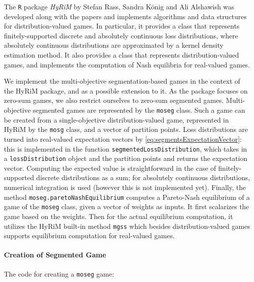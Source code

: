 \documentclass[a4paper]{scrreprt}
\theoremstyle{definition}
\begin{document}
    The \texttt{R} package \emph{HyRiM}  by Stefan Rass, Sandra König and Ali Alshawish was developed along with the papers \cite{bib:rassGameRiskManagI,bib:rassGameRiskManagII,bib:rassGameRiskManagIII} and implements algorithms and data structures for distribution-valued games.
    In particular, it provides a class that represents finitely-supported discrete and absolutely continuous loss distributions, where absolutely continuous distributions are approximated by a kernel density estimation method. It also provides a class that represents distribution-valued games, and implements the computation of Nash equilibria for real-valued games.
    
    We implement the multi-objective segmentation-based games in the context of the HyRiM package, and as a possible extension to it. As the package focuses on zero-sum games, we also restrict ourselves to zero-sum segmented games.
    Multi-objective segmented games are represented by the \texttt{moseg} class. Such a game can be created from a single-objective distribution-valued game, represented in HyRiM by the \texttt{mosg} class, and a vector of partition points.
    Loss distributions are turned into real-valued expectation vectors by \eqref{eq:segmentsExpectationVector}: this is implemented in the function \texttt{segmentedLossDistribution}, which takes in a \texttt{lossDistribution} object and the partition points and returns the expectation vector.
    Computing the expected value is straightforward in the case of finitely-supported discrete distributions as a sum; for absolutely continuous distributions, numerical integration is used 
    (however this is not implemented yet).
    Finally, the method \texttt{moseg.paretoNashEquilibrium} computes a Pareto-Nash equilibrium of a game of the \texttt{moseg} class, given a vector of weights as inputs.
    It first scalarizes the game based on the weights.
    Then for the actual equilibrium computation, it utilizes the HyRiM built-in method \texttt{mgss} which besides distribution-valued games supports equilibrium computation for real-valued games.
    
    \paragraph{Creation of Segmented Game}
    The code for creating a \texttt{moseg} game:
    
    
    
\end{document}
